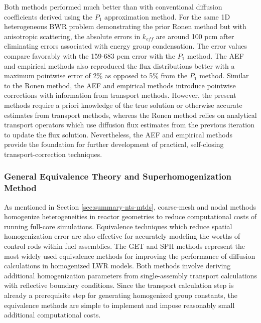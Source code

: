 Both methods performed much better than with conventional diffusion coefficients derived using the
$P_1$ approximation method. For the same 1D heterogeneous \gls{BWR} problem demonstrating the prior
Ronen method \cite{gross_high-accuracy_2020} but with anisotropic scattering, the absolute errors
in $k_{eff}$ are around 100 pcm after eliminating errors associated with energy group
condensation. The error values compare favorably with the 159-683 pcm error with the $P_1$ method.
The \gls{AEF} and empirical methods also reproduced the flux distributions better with a maximum
pointwise error of 2\% as opposed to 5\% from the $P_1$ method. Similar to the Ronen method, the
\gls{AEF} and empirical methods introduce pointwise corrections with information from transport
methods. However, the present methods require a priori knowledge of the true solution or otherwise
accurate estimates from transport methods, whereas the Ronen method relies on analytical transport
operators which use diffusion flux estimates from the previous iteration to update the flux
solution. Nevertheless, the \gls{AEF} and empirical methods provide the foundation for further
development of practical, self-closing transport-correction techniques.

\subsubsection{General Equivalence Theory and Superhomogenization Method}

As mentioned in Section \ref{sec:summary-nts-mtds}, coarse-mesh and nodal methods homogenize
heterogeneities in reactor geometries to reduce computational costs of running full-core
simulations. Equivalence techniques which reduce spatial homogenization error are also effective
for accurately modeling the worths of control rods within fuel assemblies. The \gls{GET}
\cite{koebke_new_1980, smith_nodal_1983} and \gls{SPH} \cite{kavenoky_sph_1978,
hebert_consistent_1991} methods represent the most widely used equivalence methods for improving
the performance of diffusion calculations in homogenized \gls{LWR} models. Both methods involve
deriving additional homogenization parameters from single-assembly transport calculations with
reflective boundary conditions. Since the transport calculation step is already a prerequisite step
for generating homogenized group constants, the equivalence methods are simple to implement and
impose reasonably small additional computational costs.

